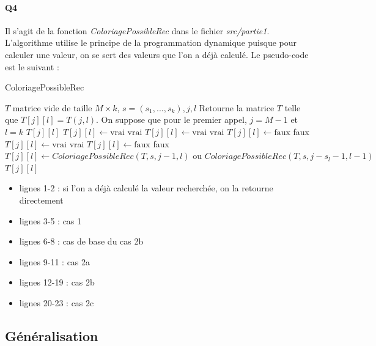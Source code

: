 \documentclass[12pt]{article}
\newcommand{\true}{\text{vrai}}
\newcommand{\false}{\text{faux}}
\begin{document}
			\paragraph{Q4}
				Il s'agit de la fonction \textit{ColoriagePossibleRec} dans le fichier \textit{src/partie1}. L'algorithme utilise le principe de la programmation dynamique puisque pour calculer une valeur, on se sert des valeurs que l'on a déjà calculé. Le pseudo-code est le suivant :
				\begin{algorithm} [H]
					\caption{ColoriagePossibleRec}
					\label{color_poss_rec}
					\begin{algorithmic}[1]
						\REQUIRE $T$ matrice vide de taille $ M \times k $, $ s=(s_1,...,s_k), j, l$ 
						\ENSURE Retourne la matrice $ T $ telle que $ T[j][l] = T(j,l) $. On suppose que pour le premier appel, $ j = M-1 $ et $ l = k $
						\RETURN $ T[j][l] $
						\STATE $ T[j][l] \leftarrow \true $
						\RETURN $ \true $
						\STATE $ T[j][l] \leftarrow \true $
						\RETURN $ \true $
						\STATE $ T[j][l] \leftarrow \false $
						\RETURN faux
						\STATE $ T[j][l] \leftarrow \true $
						\RETURN vrai
						\ELSE
						\STATE$ T[j][l] \leftarrow \false $
						\RETURN faux
						\ENDIF
						\ELSE
						\STATE $ T[j][l] \leftarrow ColoriagePossibleRec(T,s,j-1,l) \text{ ou } ColoriagePossibleRec(T,s,j-s_l-1,l-1) $
						\RETURN $ T[j][l] $
						\ENDIF\begin{flushleft}
							
						\end{flushleft}
					\end{algorithmic}
				\end{algorithm}
				
				\begin{itemize}
					\item lignes 1-2 : si  l'on a déjà calculé la valeur recherchée, on la retourne directement
					\item lignes 3-5 : cas 1
					\item lignes 6-8 : cas de base du cas 2b
					\item lignes 9-11 : cas 2a
					\item lignes 12-19 : cas 2b
					\item lignes 20-23 : cas 2c
				\end{itemize}
			
		\newpage
		\subsection{Généralisation}
		
\end{document}

